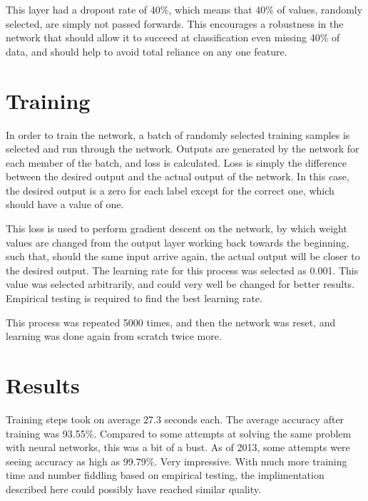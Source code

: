 \documentclass{article}
\begin{document}
This layer had a dropout rate of 40\%, which means that 40\% of values, randomly selected, are simply not passed forwards. This encourages a robustness in the network that should allow it to succeed at classification even missing 40\% of data, and should help to avoid total reliance on any one feature.

\section{Training}

In order to train the network, a batch of randomly selected training samples is selected and run through the network. Outputs are generated by the network for each member of the batch, and loss is calculated. Loss is simply the difference between the desired output and the actual output of the network. In this case, the desired output is a zero for each label except for the correct one, which should have a value of one.

This loss is used to perform gradient descent on the network, by which weight values are changed from the output layer working back towards the beginning, such that, should the same input arrive again, the actual output will be closer to the desired output. The learning rate for this process was selected as 0.001. This value was selected arbitrarily, and could very well be changed for better results. Empirical testing is required to find the best learning rate.

This process was repeated 5000 times, and then the network was reset, and learning was done again from scratch twice more.

\section{Results}

Training steps took on average 27.3 seconds each. The average accuracy after training was 93.55\%. Compared to some attempts at solving the same problem with neural networks, this was a bit of a bust. As of 2013, some attempts were seeing accuracy as high as 99.79\%. Very impressive. With much more training time and number fiddling based on empirical testing, the implimentation described here could possibly have reached similar quality.
\end{document}
